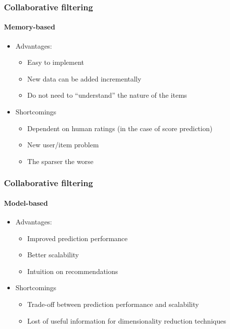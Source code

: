 \documentclass[11pt,sans]{beamer}
\begin{document}
    \begin{frame}
        \frametitle{Collaborative filtering}
        \framesubtitle{Memory-based}

        \begin{itemize}
            \item Advantages:
                \begin{itemize}
                    \item Easy to implement
                    \item New data can be added incrementally
                    \item Do not need to ``understand'' the nature of the items
                \end{itemize}
            \item Shortcomings
                \begin{itemize}
                    \item Dependent on human ratings (in the case of score
                        prediction)
                    \item New user/item problem
                    \item The sparser the worse
                \end{itemize}
        \end{itemize}
    \end{frame}

    \begin{frame}
        \frametitle{Collaborative filtering}
        \framesubtitle{Model-based}

        \begin{itemize}
            \item Advantages:
                \begin{itemize}
                    \item Improved prediction performance
                    \item Better scalability
                    \item Intuition on recommendations
                \end{itemize}
            \item Shortcomings
                \begin{itemize}
                    \item Trade-off between prediction performance and
                        scalability
                    \item Lost of useful information for dimensionality
                        reduction techniques
                \end{itemize}
        \end{itemize}
    \end{frame}
\end{document}
